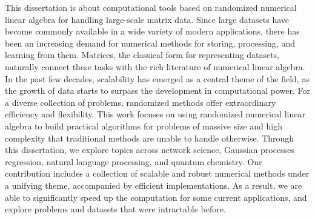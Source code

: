 This dissertation is about computational tools based on randomized numerical
linear algebra for handling large-scale matrix data. Since large datasets have
become commonly available in a wide variety of modern applications, there has
been an increasing demand for numerical methods for storing, processing, and
learning from them. Matrices, the classical form for representing datasets,
naturally connect these tasks with the rich literature of numerical linear
algebra. In the past few decades, scalability has emerged as a central theme of
the field, as the growth of data starts to surpass the development in
computational power. For a diverse collection of problems, randomized methods
offer extraordinary efficiency and flexibility. This work focuses on using
randomized numerical linear algebra to build practical algorithms for problems
of massive size and high complexity that traditional methods are unable to
handle otherwise. Through this dissertation, we explore topics across network
science, Gaussian processes regression, natural language processing, and quantum
chemistry. Our contribution includes a collection of scalable and robust
numerical methods under a unifying theme, accompanied by efficient
implementations. As a result, we are able to significantly speed up the
computation for some current applications, and explore problems and datasets
that were intractable before.